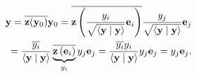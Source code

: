 {
\begin{equation}
\begin{split}
{\bf y}
=  \overline{{\bf z}({\bf y}_0)} {\bf y}_0
=  \overline{{\bf z}\left( \frac{y_i}{\sqrt{\langle{\bf y}\mid{\bf y}\rangle}}{\bf e}_i \right)}  \frac{y_j}{\sqrt{\langle{\bf y}\mid{\bf y}\rangle}}{\bf e}_j  \\
=  \frac{\overline{y_i}}{ \langle{\bf y}\mid{\bf y}\rangle }\underbrace{\overline{{\bf z}\left( {\bf e}_i \right)}}_{y_i}   y_j {\bf e}_j
=  \frac{\overline{y_i}y_i}{\langle{\bf y}\mid{\bf y}\rangle }   y_j{\bf e}_j  = y_j{\bf e}_j
.
\end{split}
\label{2018-mm-ch-fdlvs-rrtddirect21}
\end{equation}


\eproof
}



